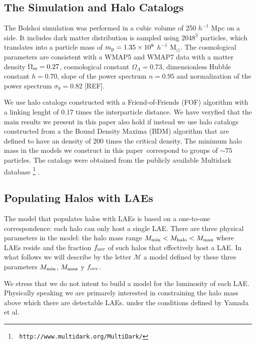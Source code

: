 \documentclass[usenatbib]{mn2e}
\newcommand{\documentname}{paper~}
\begin{document}
\subsection{The Simulation and Halo Catalogs}

The Bolshoi simulation was performed in a cubic volume of 250 $h^{-1}$
Mpc on a side. It includes dark matter distribution is sampled using
$2048^{3}$ particles, which translates into a particle mass of $m_{\rm
  p}=1.35\times 10^{8}$ $h^{-1}$ M$_{\odot}$.  The cosmological
parameters are consistent with a WMAP5 and WMAP7 data with a matter
density $\Omega_{\rm m} = 0.27$, cosmological constant
$\Omega_{\Lambda}=0.73$, dimensionless Hubble constant $h=0.70$, slope
of the power spectrum $n=0.95$ and normalization of the power spectrum
$\sigma_{8}=0.82$ [REF]. 

We use halo catalogs constructed with a Friend-of-Friends (FOF)
algorithm with a linking lenght of 0.17 times the interparticle
distance. We have veryfied that the main results we present in this
paper also hold if instead we use halo catalogs constructed from a the
Bound Density Maxima (BDM) algorithm \citep{KlypinBDM} that are
defined to have an density of 200 times the critical density. The
minimum halo mass in the models we construct in this \documentname correspond
to groups of $\sim 75$ particles. The catalogs were obtained from the
publicly available Multidark database \footnote{{\tt
    http://www.multidark.org/MultiDark/}} \citep{2011arXiv1109.0003R}.  



\subsection{Populating Halos with LAEs}
\label{subsec:mocks}

The model that populates halos with LAEs is based on a one-to-one
correspondence: each halo can only host a single LAE. There are three
physical parameters in the model: the halo mass range $M_{\rm min}<
M_{\rm halo} < M_{\rm max}$ where LAEs reside and the fraction $f_{\rm
  occ}$ of such halos that effectively host a LAE. In what follows we
will describe by the letter ${\mathcal M}$ a model defined by these
three parameters $M_{\rm min}$, $M_{\rm max}$ y $f_{\rm occ}$. 

We stress that we do not intent to build a model for the luminosity of
each LAE. Physically speaking we are primarely interested in
constraining the halo mass above which there are detectable
LAEs. under the conditions defined by Yamada et al.  
\end{document}
